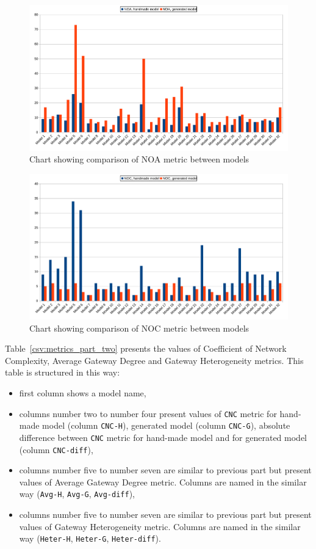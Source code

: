 \begin{figure}[p]
	\centering
	\includegraphics[width=0.95\textheight, angle=90]{./images/noa_chart.pdf}
	\caption{Chart showing comparison of NOA metric between models}
	\label{bpmn:noa_chart}
\end{figure}
\begin{figure}[p]
	\centering
	\includegraphics[width=0.95\textheight, angle=90]{./images/noc_chart.pdf}
	\caption{Chart showing comparison of NOC metric between models}
	\label{bpmn:noc_chart}
\end{figure}
Table~\ref{csv:metrics_part_two} presents the values of Coefficient of Network Complexity, Average Gateway Degree and Gateway Heterogeneity metrics. This table is structured in this way:
\begin{itemize}
	\item first column shows a model name,
	\item columns number two to number four present values of \texttt{CNC} metric for hand-made model (column \texttt{CNC-H}), generated model (column \texttt{CNC-G}), absolute difference between \texttt{CNC} metric for hand-made model and for generated model (column \texttt{CNC-diff}),
	\item columns number five to number seven are similar to previous part but present values of Average Gateway Degree metric. Columns are named in the similar way (\texttt{Avg-H}, \texttt{Avg-G}, \texttt{Avg-diff}),
	\item columns number five to number seven are similar to previous part but present values of Gateway Heterogeneity metric. Columns are named in the similar way (\texttt{Heter-H}, \texttt{Heter-G}, \texttt{Heter-diff}).
\end{itemize}
